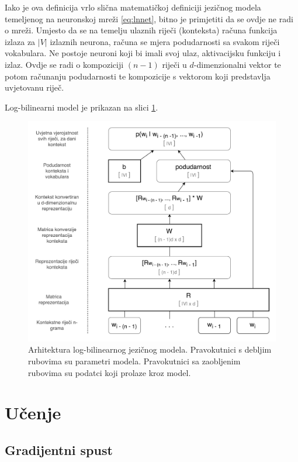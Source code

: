 \documentclass[times, utf8, diplomski, numeric]{fer}
\begin{document}
Iako je ova definicija vrlo slična matematičkoj definiciji jezičnog modela temeljenog na neuronskoj mreži \ref{eq:lnnet}, bitno je primjetiti da se ovdje ne radi o mreži. Umjesto da se na temelju ulaznih riječi (konteksta) računa funkcija izlaza za $|V|$ izlaznih neurona, računa se mjera podudarnosti sa svakom riječi vokabulara. Ne postoje neuroni koji bi imali svoj ulaz, aktivacijsku funkciju i izlaz. Ovdje se radi o kompoziciji $(n - 1)$ riječi u $d$-dimenzionalni vektor te potom računanju podudarnosti te kompozicije s vektorom koji predstavlja uvjetovanu riječ.

Log-bilinearni model je prikazan na slici \ref{fig:lbl}.

\begin{figure}[!htb]
\centering
\includegraphics[scale=0.5]{fig/lbl.pdf}
\caption{Arhitektura log-bilinearnog jezičnog modela. Pravokutnici s debljim rubovima su parametri modela. Pravokutnici sa zaobljenim rubovima su podatci koji prolaze kroz model.}
\label{fig:lbl}
\end{figure}

\section{Učenje}

\subsection{Gradijentni spust}
\end{document}
